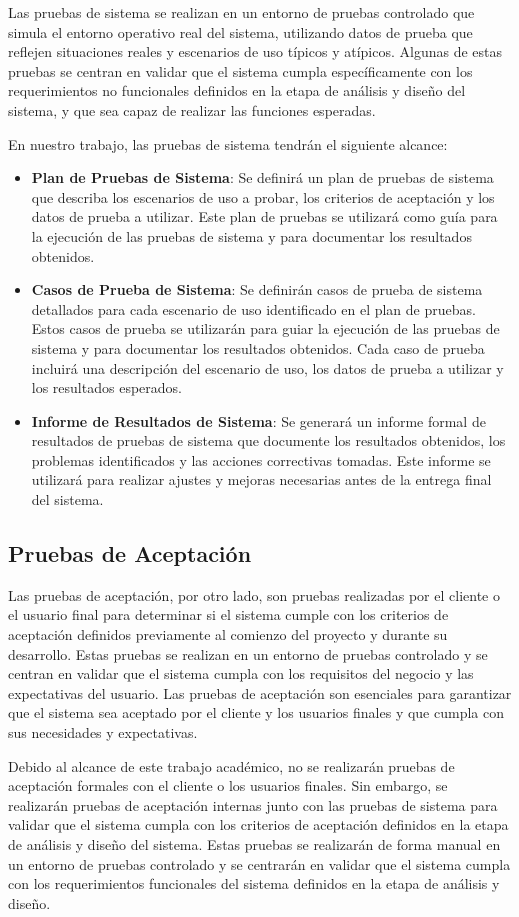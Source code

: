 \documentclass[main.tex]{subfiles}
\begin{document}
Las pruebas de sistema se realizan en un entorno de pruebas controlado que simula el entorno operativo real del sistema, utilizando datos de prueba que reflejen situaciones reales y escenarios de uso típicos y atípicos. Algunas de estas pruebas se centran en validar que el sistema cumpla específicamente con los requerimientos no funcionales definidos en la etapa de análisis y diseño del sistema, y que sea capaz de realizar las funciones esperadas.

En nuestro trabajo, las pruebas de sistema tendrán el siguiente alcance:

\begin{itemize}
	\item \textbf{Plan de Pruebas de Sistema}: Se definirá un plan de pruebas de sistema que describa los escenarios de uso a probar, los criterios de aceptación y los datos de prueba a utilizar. Este plan de pruebas se utilizará como guía para la ejecución de las pruebas de sistema y para documentar los resultados obtenidos.
	\item \textbf{Casos de Prueba de Sistema}: Se definirán casos de prueba de sistema detallados para cada escenario de uso identificado en el plan de pruebas. Estos casos de prueba se utilizarán para guiar la ejecución de las pruebas de sistema y para documentar los resultados obtenidos. Cada caso de prueba incluirá una descripción del escenario de uso, los datos de prueba a utilizar y los resultados esperados.
	\item \textbf{Informe de Resultados de Sistema}: Se generará un informe formal de resultados de pruebas de sistema que documente los resultados obtenidos, los problemas identificados y las acciones correctivas tomadas. Este informe se utilizará para realizar ajustes y mejoras necesarias antes de la entrega final del sistema.
\end{itemize}

\subsection{Pruebas de Aceptación}

Las pruebas de aceptación, por otro lado, son pruebas realizadas por el cliente o el usuario final para determinar si el sistema cumple con los criterios de aceptación definidos previamente al comienzo del proyecto y durante su desarrollo. Estas pruebas se realizan en un entorno de pruebas controlado y se centran en validar que el sistema cumpla con los requisitos del negocio y las expectativas del usuario. Las pruebas de aceptación son esenciales para garantizar que el sistema sea aceptado por el cliente y los usuarios finales y que cumpla con sus necesidades y expectativas.

Debido al alcance de este trabajo académico, no se realizarán pruebas de aceptación formales con el cliente o los usuarios finales. Sin embargo, se realizarán pruebas de aceptación internas junto con las pruebas de sistema para validar que el sistema cumpla con los criterios de aceptación definidos en la etapa de análisis y diseño del sistema. Estas pruebas se realizarán de forma manual en un entorno de pruebas controlado y se centrarán en validar que el sistema cumpla con los requerimientos funcionales del sistema definidos en la etapa de análisis y diseño.
\end{document}
